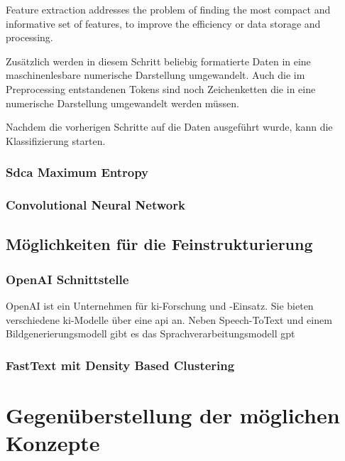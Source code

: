 \begin{definition}
	\label{d:feature-extraction}
	\glqq Feature extraction addresses the problem of finding the most compact and informative set of features, to improve the efficiency or data storage and processing.\grqq{} \citep{Guyon2006}
\end{definition}
Zusätzlich werden in diesem Schritt beliebig formatierte Daten in eine  maschinenlesbare numerische Darstellung umgewandelt. \citep{scit-learn_featureextraction} Auch die im Preprocessing entstandenen Tokens sind noch Zeichenketten die in eine numerische Darstellung umgewandelt werden müssen.

Nachdem die vorherigen Schritte auf die Daten ausgeführt wurde, kann die Klassifizierung starten.

\subsection{Sdca Maximum Entropy}
\label{c:conception:classification:sdca}
\subsection{Convolutional Neural Network}
\label{c:conception:classification:cnn}
\section{Möglichkeiten für die Feinstrukturierung}
\label{c:conception:fine-structuring}
\subsection{OpenAI Schnittstelle}
\label{c:conception:fine-structuring:openai}
OpenAI ist ein Unternehmen für \ac{ki}-Forschung und -Einsatz. Sie bieten verschiedene \ac{ki}-Modelle über eine \ac{api} an. Neben Speech-ToText und einem Bildgenerierungsmodell gibt es das Sprachverarbeitungsmodell \ac{gpt}
\subsection{FastText mit Density Based Clustering}
\label{c:conception:fine-structuring:dbscan}


\chapter{Gegenüberstellung der möglichen Konzepte}
\label{c:comparison}

